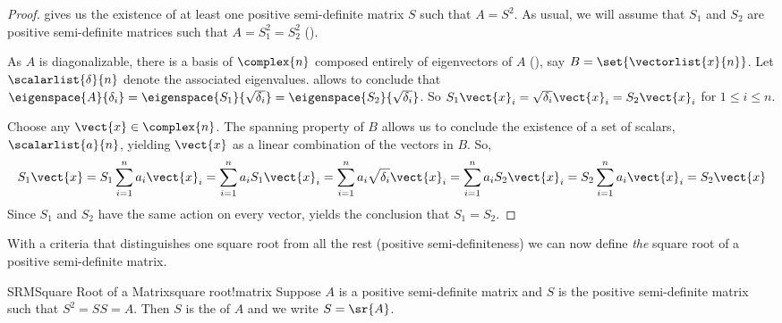 %
\begin{proof}
%
 gives us the existence of at least one positive semi-definite matrix $S$ such that $A=S^2$.  As usual, we will assume that $S_1$ and $S_2$ are positive semi-definite matrices such that $A=S_1^2=S_2^2$ ().\par
%
As $A$ is diagonalizable, there is a basis of $\complex{n}$ composed entirely of eigenvectors of $A$ (), say $B=\set{\vectorlist{x}{n}}$.  Let $\scalarlist{\delta}{n}$ denote the associated eigenvalues.   allows to conclude that  $\eigenspace{A}{\delta_i}=\eigenspace{S_1}{\sqrt{\delta_i}}=\eigenspace{S_2}{\sqrt{\delta_i}}$.   So $S_1\vect{x}_i=\sqrt{\delta_i}\vect{x}_i=S_2\vect{x}_i$ for $1\leq i\leq n$.\par
%
Choose any $\vect{x}\in\complex{n}$.  The spanning property of $B$ allows us to conclude the existence of a set of scalars, $\scalarlist{a}{n}$, yielding $\vect{x}$ as a linear combination of the vectors in $B$.  So,
%
\begin{align*}
S_1\vect{x}
=S_1\sum_{i=1}^{n}a_i\vect{x}_i
=\sum_{i=1}^{n}a_iS_1\vect{x}_i
=\sum_{i=1}^{n}a_i\sqrt{\delta_i}\vect{x}_i
=\sum_{i=1}^{n}a_iS_2\vect{x}_i
=S_2\sum_{i=1}^{n}a_i\vect{x}_i
=S_2\vect{x}
\end{align*}
%
Since $S_1$ and $S_2$ have the same action on every vector,  yields the conclusion that $S_1=S_2$.
%
\end{proof}
%
With a criteria that distinguishes one square root from all the rest (positive semi-definiteness) we can now define {\em the} square root of a positive semi-definite matrix.
%
\begin{definition}{SRM}{Square Root of a Matrix}{square root!matrix}
Suppose $A$ is a positive semi-definite matrix and $S$ is the positive semi-definite matrix such that $S^2=SS=A$.  Then $S$ is the  of $A$ and we write $S=\sr{A}$.
\end{definition}
%
%
